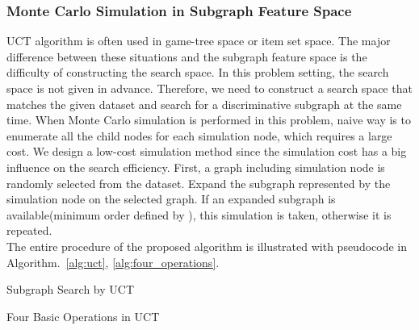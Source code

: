 \subsubsection*{Monte Carlo Simulation in Subgraph Feature Space}
UCT algorithm is often used in game-tree space or item set space.
The major difference between these situations and the subgraph feature space 
is the difficulty of constructing the search space.
In this problem setting, the search space is not given in advance.
Therefore, we need to construct a search space that matches the given dataset 
and search for a discriminative subgraph at the same time.
When Monte Carlo simulation is performed in this problem, 
naive way is to enumerate all the child nodes for each simulation node, which requires a large cost.
We design a low-cost simulation method 
since the simulation cost has a big influence on the search efficiency.
First, a graph including simulation node is randomly selected from the dataset.
Expand the subgraph represented by the simulation node on the selected graph.
If an expanded subgraph is available(minimum order defined by \cite{Yan:2002}), 
this simulation is taken, otherwise it is repeated. \\
The entire procedure of the proposed algorithm is illustrated with pseudocode in 
Algorithm.~\ref{alg:uct}, \ref{alg:four_operations}.\\

\begin{algorithm2e}[H]
  \caption{Subgraph Search by UCT}
  \label{alg:uct}
\end{algorithm2e}

\begin{algorithm2e}[H]
  \caption{Four Basic Operations in UCT}
  \label{alg:four_operations}
\end{algorithm2e}
